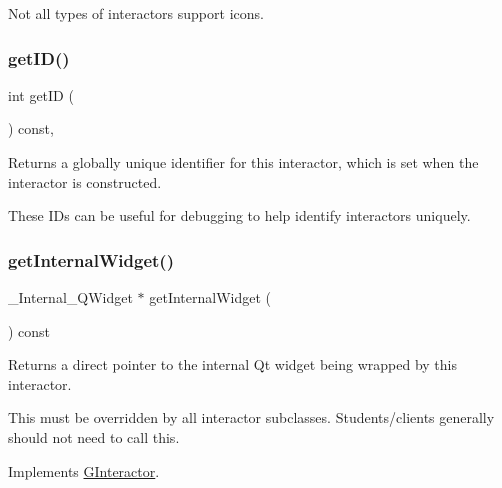 Not all types of interactors support icons. \mbox{\label{classGInteractor_a9c9659a6c6ba66b4107ba59c95a24241}} 
\subsubsection{\texorpdfstring{get\+I\+D()}{getID()}}
{\footnotesize\ttfamily int get\+ID (\begin{DoxyParamCaption}{ }\end{DoxyParamCaption}) const\hspace{0.3cm}{\ttfamily [virtual]}, {\ttfamily [inherited]}}



Returns a globally unique identifier for this interactor, which is set when the interactor is constructed. 

These I\+Ds can be useful for debugging to help identify interactors uniquely. \mbox{\label{classGCanvas_a208ce13c1da40bf0ddb509daf99d6588}} 
\subsubsection{\texorpdfstring{get\+Internal\+Widget()}{getInternalWidget()}}
{\footnotesize\ttfamily \+\_\+\+Internal\+\_\+\+Q\+Widget $\ast$ get\+Internal\+Widget (\begin{DoxyParamCaption}{ }\end{DoxyParamCaption}) const\hspace{0.3cm}{\ttfamily [virtual]}}



Returns a direct pointer to the internal Qt widget being wrapped by this interactor. 

This must be overridden by all interactor subclasses. Students/clients generally should not need to call this. 

Implements \mbox{\hyperlink{classGInteractor}{G\+Interactor}}.

\mbox{\label{classGDrawingSurface_aaf1f5ea8281e5e3486662878d26f0a13}} 

